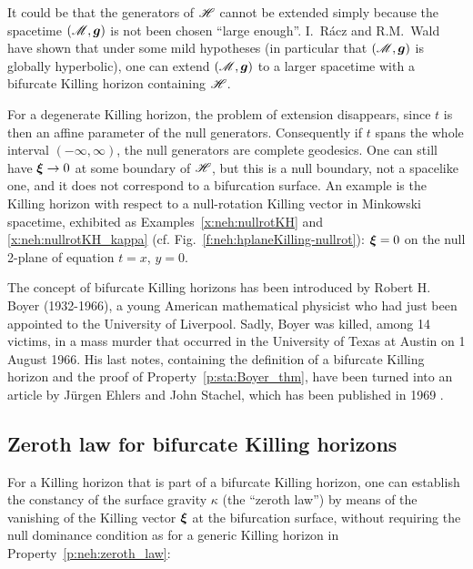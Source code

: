 \begin{remark}
\label{r:sta:extension_bifurcate}
It could be that the generators of $\mathscr{H}$ cannot be extended simply
because the spacetime $(\mathscr{M},\bm{g})$ is not been chosen ``large enough''.
I.~R\'acz and R.M.~Wald \cite{RaczW96}
have shown that under some mild hypotheses (in particular that $(\mathscr{M},\bm{g})$ is globally
hyperbolic), one can extend $(\mathscr{M},\bm{g})$ to a larger spacetime with a bifurcate
Killing horizon containing $\mathscr{H}$.
\end{remark}

\begin{remark}
For a degenerate Killing horizon, the problem of extension disappears, since
$t$ is then an affine parameter of the null generators. Consequently if $t$ spans
the whole interval $(-\infty,\infty)$, the null generators are complete
geodesics. One can still have $\bm{\xi}\rightarrow 0$ at some boundary
of $\mathscr{H}$, but this is a null boundary, not a spacelike one, and it does not
correspond to a bifurcation surface. An example is the Killing horizon with
respect to a null-rotation Killing vector in Minkowski spacetime, exhibited
as Examples~\ref{x:neh:nullrotKH} and \ref{x:neh:nullrotKH_kappa} (cf. Fig.~\ref{f:neh:hplaneKilling-nullrot}): $\bm{\xi}=0$
on the null 2-plane of equation $t=x$, $y=0$.
\end{remark}

\begin{hist} \label{h:sta:Boyer}
The concept of bifurcate Killing horizons has been introduced by Robert H. Boyer
(1932-1966), a young American mathematical physicist who had just been appointed
to the University of Liverpool. Sadly, Boyer was killed, among 14 victims, in a mass murder that
occurred in the University of Texas at Austin on 1 August 1966.
His last notes, containing the definition of a bifurcate Killing horizon
and the proof of Property~\ref{p:sta:Boyer_thm}, have been turned into an article
by Jürgen Ehlers and John Stachel, which has
been published in 1969 \cite{Boyer69}.
\end{hist}

\subsection{Zeroth law for bifurcate Killing horizons} \label{s:neh:zeroth_law_bifur}

For a Killing horizon that is part of a bifurcate Killing horizon, one can establish
the constancy of the surface gravity $\kappa$ (the ``zeroth law'') by means of the vanishing of
the Killing vector $\bm{\xi}$
at the bifurcation surface, without requiring the null dominance condition as for a generic Killing horizon
in Property~\ref{p:neh:zeroth_law}:

